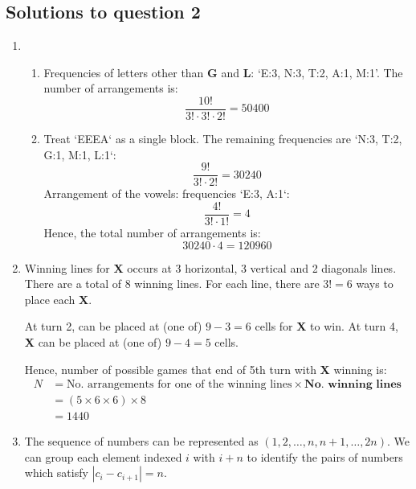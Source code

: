 \documentclass{article}
\begin{document}
\subsection*{Solutions to question 2}

\begin{enumerate}[label=(\alph*)]
    \item
          \begin{enumerate}[label=(\roman*)]
              \item Frequencies of letters other than \textbf{G} and \textbf{L}: `E:3, N:3, T:2, A:1, M:1'. The number of arrangements is:
                    \[
                        \frac{10!}{3! \cdot 3! \cdot 2!} = 50400
                    \]
              \item Treat `EEEA` as a single block. The remaining frequencies are `N:3, T:2, G:1, M:1, L:1`:
                    \[
                        \frac{9!}{3! \cdot 2!} = 30240
                    \]
                    Arrangement of the vowels: frequencies `E:3, A:1`:
                    \[
                        \frac{4!}{3! \cdot 1!} = 4
                    \]
                    Hence, the total number of arrangements is:
                    \[
                        30240 \cdot 4 = 120960
                    \]
          \end{enumerate}
    \item
          Winning lines for \textbf{X} occurs at 3 horizontal, 3 vertical and 2 diagonals lines. There are a total of $8$ winning lines. For each line, there are $3! = 6$ ways to place each \textbf{X}.

          At turn 2,  can be placed at (one of) $9-3=6$ cells for \textbf{X} to win. At turn 4, \textbf{X} can be placed at (one of) $9-4=5$ cells.

          Hence, number of possible games that end of 5th turn with \textbf{X} winning is:
          \[
              \begin{aligned}
                  N & = \text{No. arrangements for one of the winning lines} \times \textbf{No. winning lines} \\
                    & = (5 \times 6 \times 6) \times 8                                                         \\
                    & = 1440
              \end{aligned}
          \]
    \item
          The sequence of numbers can be represented as \( (1, 2, \dots, n, n+1, \dots, 2n) \). We can group each element indexed $i$ with $i+n$ to identify the pairs of numbers which satisfy $|c_i - c_{i+1}| = n$.


\end{enumerate}
\end{document}
